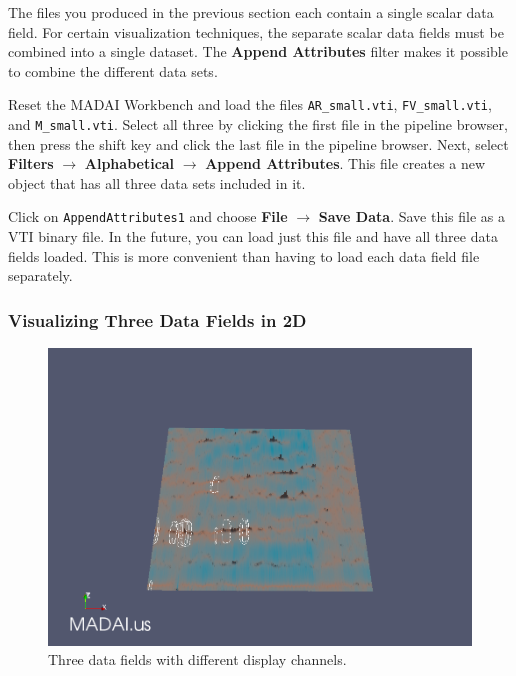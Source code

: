\documentclass[12pt]{article}
\newcommand{\filter}[1]{\textbf{#1}}
\newcommand{\filterinstance}[1]{\texttt{#1}}
\newcommand{\menu}[1]{\textbf{#1}}
\newcommand{\file}[1]{\texttt{#1}}
\begin{document}
The files you produced in the previous section each contain a single scalar data field. For certain visualization techniques, the separate scalar data fields must be combined into a single dataset. The \filter{Append Attributes} filter makes it possible to combine the different data sets.

Reset the MADAI Workbench and load the files \file{AR\_small.vti}, \file{FV\_small.vti}, and \file{M\_small.vti}. Select all three by clicking the first file in the pipeline browser, then press the shift key and click the last file in the pipeline browser. Next, select \menu{Filters} $\rightarrow$ \menu{Alphabetical} $\rightarrow$ \menu{Append Attributes}. This file creates a new object that has all three data sets included in it.

Click on \filterinstance{AppendAttributes1} and choose \menu{File} $\rightarrow$ \menu{Save Data}. Save this file as a VTI binary file. In the future, you can load just this file and have all three data fields loaded. This is more convenient than having to load each data field file separately.

\subsubsection{Visualizing Three Data Fields in 2D}

\begin{figure}[htbp]
   \centering
   \includegraphics[scale=.35]{images/ThreeScalarsCombined.png} %
   \caption{Three data fields with different display channels.}
   \label{fig:ThreeScalarsCombined}
\end{figure}
\end{document}
